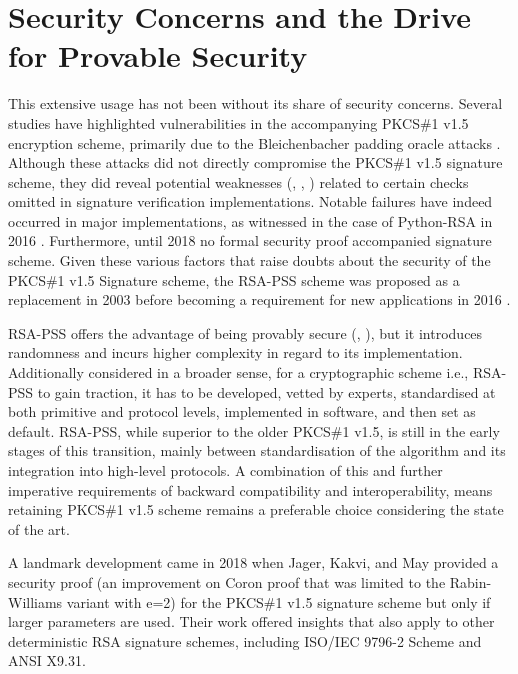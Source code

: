\documentclass[]{final_report}
\theoremstyle{definition}
\begin{document}
\section{Security Concerns and the Drive for Provable Security}
This extensive usage has not been without its share of security concerns. Several studies \cite{bleichenbacher1998chosen, coppersmith1996low, coron2000new, 10.1007/978-3-540-45238-6_33, degabriele2012joint, bardou2012efficient, meyer2014revisiting, zhang2014cross, jager2015security, jager2015practical, bock2018return} have highlighted vulnerabilities in the accompanying PKCS\#1 v1.5 encryption scheme, primarily due to the Bleichenbacher padding oracle attacks \cite{bleichenbacher1998chosen}. Although these attacks did not directly compromise the PKCS\#1 v1.5 signature scheme, they did reveal potential weaknesses (\cite{finney2006bleichenbacher}, \cite{kuhn2008variants}, \cite{cve-2006-4790, cve-2006-4340, bugzilla-1064636, intel-berserk-vulnerability, josefsson-signature-forgery, valsorda-bleichenbacher-forgery}) related to certain checks omitted in signature verification implementations. Notable failures have indeed occurred in major implementations, as witnessed in the case of Python-RSA in 2016  \cite{valsorda-bleichenbacher-forgery}. Furthermore, until 2018 no formal security proof accompanied signature scheme. Given these various factors that raise doubts about the security of the PKCS\#1 v1.5 Signature scheme, the RSA-PSS scheme was proposed as a replacement in 2003 \cite{rfc3447} before becoming a requirement for new applications in 2016 \cite{rfc8017}. 

RSA-PSS offers the advantage of being provably secure  (\cite{bellare1996exact}, \cite{jonsson2001security}), but it introduces randomness and incurs higher complexity in regard to its implementation.
Additionally considered in a broader sense, for  a cryptographic scheme i.e., RSA-PSS to gain traction, it has to be developed, vetted by experts, standardised at both primitive and protocol levels, implemented in software, and then set as default. RSA-PSS, while superior to the older PKCS\#1 v1.5, is still in the early stages of this transition, mainly between standardisation of the algorithm and its integration into high-level protocols.
A combination of this and further imperative requirements of backward compatibility and interoperability, means retaining PKCS\#1 v1.5 scheme remains a preferable choice considering the state of the art.

A landmark development came in 2018 when Jager, Kakvi, and May \cite{jager2018security} provided a security proof (an improvement on Coron \cite{coron2002security} proof that was limited to the Rabin-Williams variant with e=2) for the PKCS\#1 v1.5 signature scheme but only if larger parameters are used. Their work offered insights that also apply to other deterministic RSA signature schemes, including ISO/IEC 9796-2 Scheme and ANSI X9.31.
\end{document}
